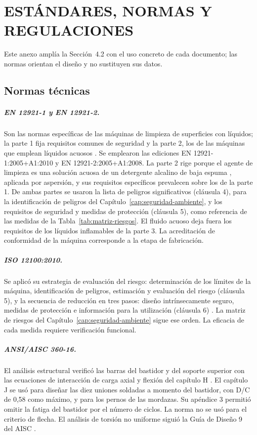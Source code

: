 \chapter{ESTÁNDARES, NORMAS Y REGULACIONES}
\label{anx:normas}

Este anexo amplía la Sección~4.2 con el uso concreto de cada documento; las normas orientan el diseño y no sustituyen sus datos.

\section{Normas técnicas}

\paragraph{EN 12921-1 y EN 12921-2.} Son las normas específicas de las máquinas de limpieza de superficies con líquidos; la parte 1 fija requisitos comunes de seguridad y la parte 2, los de las máquinas que emplean líquidos acuosos \cite{en12921_1,en12921_2}. Se emplearon las ediciones EN 12921-1:2005+A1:2010 y EN 12921-2:2005+A1:2008. La parte 2 rige porque el agente de limpieza es una solución acuosa de un detergente alcalino de baja espuma \cite{zep36342}, aplicada por aspersión, y sus requisitos específicos prevalecen sobre los de la parte 1. De ambas partes se usaron la lista de peligros significativos (cláusula 4), para la identificación de peligros del Capítulo~\ref{cap:seguridad-ambiente}, y los requisitos de seguridad y medidas de protección (cláusula 5), como referencia de las medidas de la Tabla~\ref{tab:matriz-riesgos}. El fluido acuoso deja fuera los requisitos de los líquidos inflamables de la parte 3. La acreditación de conformidad de la máquina corresponde a la etapa de fabricación.

\paragraph{ISO 12100:2010.} Se aplicó su estrategia de evaluación del riesgo: determinación de los límites de la máquina, identificación de peligros, estimación y evaluación del riesgo (cláusula 5), y la secuencia de reducción en tres pasos: diseño intrínsecamente seguro, medidas de protección e información para la utilización (cláusula 6) \cite{iso12100}. La matriz de riesgos del Capítulo~\ref{cap:seguridad-ambiente} sigue ese orden. La eficacia de cada medida requiere verificación funcional.

\paragraph{ANSI/AISC 360-16.} El análisis estructural verificó las barras del bastidor y del soporte superior con las ecuaciones de interacción de carga axial y flexión del capítulo H \cite{aisc360}. El capítulo J se usó para diseñar las diez uniones soldadas a momento del bastidor, con D/C de 0,58 como máximo, y para los pernos de las mordazas. Su apéndice 3 permitió omitir la fatiga del bastidor por el número de ciclos. La norma no se usó para el criterio de flecha. El análisis de torsión no uniforme siguió la Guía de Diseño 9 del AISC \cite{aiscdg9}.

